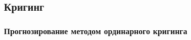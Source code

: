 \documentclass[10pt,pdf,aspectratio=169]{beamer}
\begin{document}
\subsection{Кригинг}
\begin{frame}
  \frametitle{Прогнозирование методом ординарного кригинга}   %
   \begin{columns}[c]
   \column{4.5in}
  \end{columns}
\end{frame}

\end{document}
